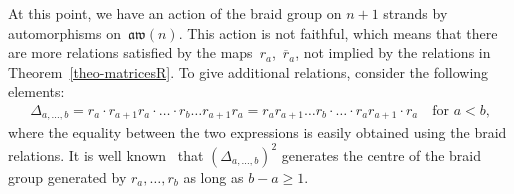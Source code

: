 \documentclass[10pt,a4paper]{amsart}
\numberwithin{equation}{section}
\theoremstyle{definition}
\newcommand{\rb}{\overline{r}}
\newcommand{\aw}{\mathfrak{aw}(n)}
\begin{document}
At this point, we have an action of the braid group on $n+1$ strands by automorphisms on~$\aw$. This action is not faithful, which means that there are more relations satisfied by the maps~$r_a$,~$\rb_a$, not implied by the relations in Theorem~\ref{theo-matricesR}. To give additional relations, consider the following elements:
\begin{gather}\label{def-Delta}
\Delta_{a,\dots,b}=r_a\cdot r_{a+1}r_a\cdot \ldots \cdot r_{b}\ldots r_{a+1}r_a=r_ar_{a+1}\ldots r_{b}\cdot\ldots\cdot r_a r_{a+1}\cdot r_a \quad \text{for $a<b$,}
\end{gather}
where the equality between the two expressions is easily obtained using the braid relations. It is well known~\cite{KT} that $(\Delta_{a,\dots,b})^2$ generates
the centre of the braid group generated by $r_{a},\ldots, r_{b}$ as long as $b-a\geq 1$.
\end{document}

